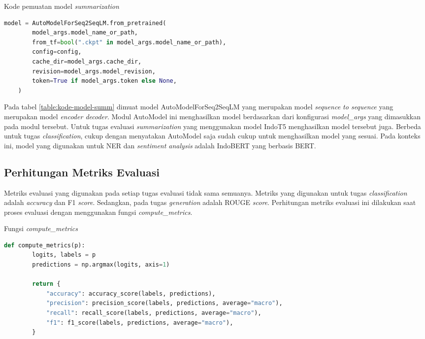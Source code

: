 \begin{table}[h]
    \caption{Kode pemuatan model \textit{summarization}}
    \label{table:kode-model-summ}
    \begin{lstlisting}[language=python]
    model = AutoModelForSeq2SeqLM.from_pretrained(
        model_args.model_name_or_path,
        from_tf=bool(".ckpt" in model_args.model_name_or_path),
        config=config,
        cache_dir=model_args.cache_dir,
        revision=model_args.model_revision,
        token=True if model_args.token else None,
    )
    \end{lstlisting}
\end{table}

Pada tabel \ref{table:kode-model-summ} dimuat model AutoModelForSeq2SeqLM yang merupakan model \textit{sequence to sequence} yang merupakan model \textit{encoder decoder}. Modul AutoModel ini  menghasilkan model berdasarkan dari konfigurasi \textit{model\_args} yang dimasukkan pada modul tersebut. Untuk tugas evaluasi \textit{summarization} yang menggunakan model IndoT5  menghasilkan model tersebut juga. Berbeda untuk tugas \textit{classification}, cukup dengan menyatakan AutoModel saja sudah cukup untuk menghasilkan model yang sesuai. Pada konteks ini, model yang digunakan untuk NER dan \textit{sentiment analysis} adalah IndoBERT yang berbasis BERT.

\subsection{Perhitungan Metriks Evaluasi}
\label{sec:metriks-evaluasi}

Metriks evaluasi yang digunakan pada setiap tugas evaluasi tidak sama semuanya. Metriks yang digunakan untuk tugas \textit{classification} adalah \textit{accuracy} dan F1 \textit{score}. Sedangkan, pada tugas \textit{generation} adalah ROUGE \textit{score}. Perhitungan metriks evaluasi ini dilakukan saat proses evaluasi dengan menggunakan fungsi \textit{compute\_metrics}.

\begin{table}[h]
    \caption{Fungsi \textit{compute\_metrics}}
    \label{table:compute-metrics}
    \begin{lstlisting}[language=python]
    def compute_metrics(p):
        logits, labels = p
        predictions = np.argmax(logits, axis=1)

        return {
            "accuracy": accuracy_score(labels, predictions),
            "precision": precision_score(labels, predictions, average="macro"),
            "recall": recall_score(labels, predictions, average="macro"),
            "f1": f1_score(labels, predictions, average="macro"),
        }
    \end{lstlisting}
\end{table}


